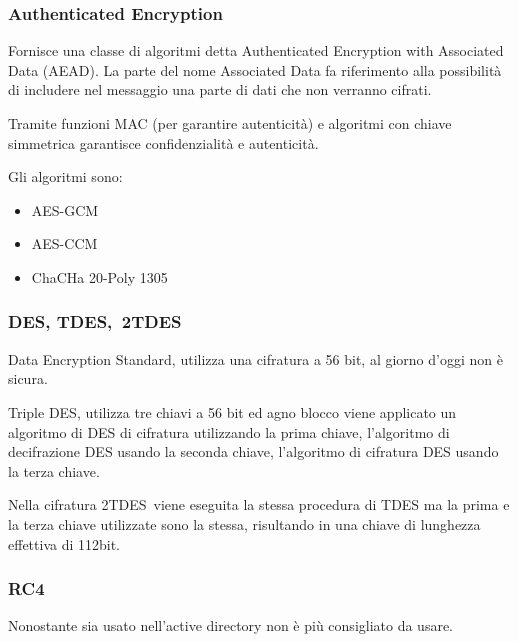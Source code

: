 \documentclass[
]{article}
\providecommand{\tightlist}{%
  \setlength{\itemsep}{0pt}\setlength{\parskip}{0pt}}
\begin{document}
{}

\subsubsection{\texorpdfstring{{Authenticated
Encryption}}{Authenticated Encryption}}\label{h.j6l6hnrqxqnx}

{Fornisce una classe di algoritmi detta Authenticated Encryption with
Associated Data (AEAD). La parte del nome Associated Data fa riferimento
alla possibilità di includere nel messaggio una parte di dati che non
verranno cifrati.}

{}

{Tramite funzioni MAC (per garantire autenticità) e algoritmi con chiave
simmetrica garantisce confidenzialità e autenticità.}

{}

{Gli algoritmi sono:}

\begin{itemize}
\tightlist
\item
  {AES-GCM}
\item
  {AES-CCM}
\item
  {ChaCHa 20-Poly 1305}
\end{itemize}

\subsubsection{\texorpdfstring{{DES,
}{TDES,}{~}{2TDES}}{DES, TDES,~2TDES}}\label{h.afvyw0ll4ey1}

{Data Encryption Standard, utilizza una cifratura a 56 bit, al giorno
d'oggi non è sicura.}

{}

{Triple DES, utilizza tre chiavi a 56 bit ed agno blocco viene applicato
un algoritmo di DES di cifratura utilizzando la prima chiave,
l'algoritmo di decifrazione DES usando la seconda chiave, l'algoritmo di
cifratura DES usando la terza chiave.}

{}

{Nella cifratura }{2TDES}{~viene eseguita la stessa procedura di TDES ma
la prima e la terza chiave utilizzate sono la stessa, risultando in una
chiave di lunghezza effettiva di }{112bit.}

\subsubsection{\texorpdfstring{{RC4}}{RC4}}\label{h.r4p8girtqukl}

{Nonostante sia usato nell'active directory non è più consigliato da
usare.}
\end{document}
